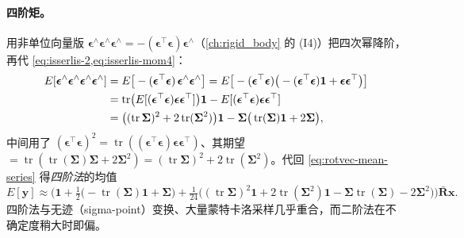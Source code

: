 \paragraph{四阶矩。}用非单位向量版 $\boldsymbol{\epsilon}^\wedge\boldsymbol{\epsilon}^\wedge\boldsymbol{\epsilon}^\wedge=-(\boldsymbol{\epsilon}^\top\boldsymbol{\epsilon})\boldsymbol{\epsilon}^\wedge$（\cref{ch:rigid_body} 的 (I4)）把四次幂降阶，再代 \cref{eq:isserlis-2,eq:isserlis-mom4}：
\begin{align}
  E[\boldsymbol{\epsilon}^\wedge\boldsymbol{\epsilon}^\wedge\boldsymbol{\epsilon}^\wedge\boldsymbol{\epsilon}^\wedge]
  &=E\big[-(\boldsymbol{\epsilon}^\top\boldsymbol{\epsilon})\,\boldsymbol{\epsilon}^\wedge\boldsymbol{\epsilon}^\wedge\big]
   =E\big[-(\boldsymbol{\epsilon}^\top\boldsymbol{\epsilon})\big(-(\boldsymbol{\epsilon}^\top\boldsymbol{\epsilon})\mathbf{1}+\boldsymbol{\epsilon}\boldsymbol{\epsilon}^\top\big)\big]\notag\\
  &=\operatorname{tr}\!\big(E[(\boldsymbol{\epsilon}^\top\boldsymbol{\epsilon})\boldsymbol{\epsilon}\boldsymbol{\epsilon}^\top]\big)\mathbf{1}-E[(\boldsymbol{\epsilon}^\top\boldsymbol{\epsilon})\boldsymbol{\epsilon}\boldsymbol{\epsilon}^\top]\notag\\
  &=\big((\operatorname{tr}\boldsymbol{\Sigma})^2+2\operatorname{tr}(\boldsymbol{\Sigma}^2)\big)\mathbf{1}-\boldsymbol{\Sigma}\big(\operatorname{tr}(\boldsymbol{\Sigma})\mathbf{1}+2\boldsymbol{\Sigma}\big),
  \label{eq:isserlis-4}
\end{align}
中间用了 $(\boldsymbol{\epsilon}^\top\boldsymbol{\epsilon})^2=\operatorname{tr}((\boldsymbol{\epsilon}^\top\boldsymbol{\epsilon})\boldsymbol{\epsilon}\boldsymbol{\epsilon}^\top)$、其期望 $=\operatorname{tr}(\operatorname{tr}(\boldsymbol{\Sigma})\boldsymbol{\Sigma}+2\boldsymbol{\Sigma}^2)=(\operatorname{tr}\boldsymbol{\Sigma})^2+2\operatorname{tr}(\boldsymbol{\Sigma}^2)$。代回 \cref{eq:rotvec-mean-series} 得\emph{四阶法}的均值
\begin{equation}
  E[\mathbf{y}]\approx\Big(\mathbf{1}+\tfrac12\big(-\operatorname{tr}(\boldsymbol{\Sigma})\mathbf{1}+\boldsymbol{\Sigma}\big)+\tfrac1{24}\big((\operatorname{tr}\boldsymbol{\Sigma})^2\mathbf{1}+2\operatorname{tr}(\boldsymbol{\Sigma}^2)\mathbf{1}-\boldsymbol{\Sigma}\operatorname{tr}(\boldsymbol{\Sigma})-2\boldsymbol{\Sigma}^2\big)\Big)\bar{\mathbf{R}}\mathbf{x}.
  \label{eq:rotvec-mean-4th}
\end{equation}
四阶法与无迹（sigma-point）变换、大量蒙特卡洛采样几乎重合，而二阶法在不确定度稍大时即偏\cite{barfoot2024state}。

